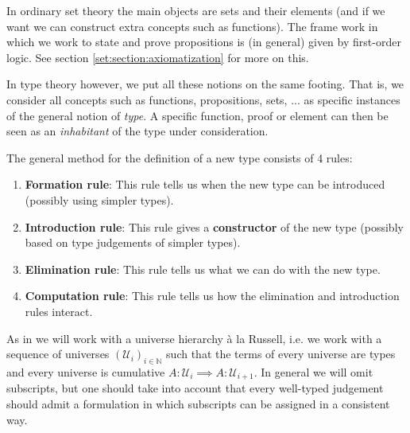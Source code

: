     In ordinary set theory the main objects are sets and their elements (and if we want we can construct extra concepts such as functions). The frame work in which we work to state and prove propositions is (in general) given by first-order logic. See section \ref{set:section:axiomatization} for more on this.

    In type theory however, we put all these notions on the same footing. That is, we consider all concepts such as functions, propositions, sets, ... as specific instances of the general notion of \textit{type}. A specific function, proof or element can then be seen as an \textit{inhabitant} of the type under consideration.

    \begin{method}
        The general method for the definition of a new type consists of 4 rules:
        \begin{enumerate}
            \item \textbf{Formation rule}: This rule tells us when the new type can be introduced (possibly using simpler types).
            \item \textbf{Introduction rule}: This rule gives a \textbf{constructor} of the new type (possibly based on type judgements of simpler types).
            \item \textbf{Elimination rule}: This rule tells us what we can do with the new type.
            \item \textbf{Computation rule}: This rule tells us how the elimination and introduction rules interact.
        \end{enumerate}
    \end{method}

    As in \cite{hott} we will work with a universe hierarchy \`a la Russell, i.e. we work with a sequence of universes $(\mathcal{U}_i)_{i\in\mathbb{N}}$ such that the terms of every universe are types and every universe is cumulative $A:\mathcal{U}_i\implies A:\mathcal{U}_{i+1}$. In general we will omit subscripts, but one should take into account that every well-typed judgement should admit a formulation in which subscripts can be assigned in a consistent way.


